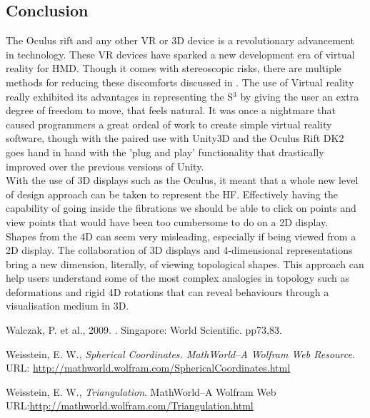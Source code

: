 \documentclass[12pt]{article} %
\begin{document}
\begin{flushleft}
\subsection{Conclusion} %
The Oculus rift and any other VR or 3D device is a revolutionary advancement in technology. These VR devices have sparked a new development era of virtual reality for HMD. Though it comes with stereoscopic risks, there are multiple methods for reducing these discomforts discussed in \cite{discomfort}. The use of Virtual reality really exhibited its advantages in representing the S$^{3}$ by giving the user an extra degree of freedom to move, that feels natural. It was once a nightmare that caused programmers a great ordeal of work to create simple virtual reality software, though with the paired use with Unity3D and the Oculus Rift DK2 goes hand in hand with the 'plug and play' functionality that drastically improved over the previous versions of Unity.\\
With the use of 3D displays such as the Oculus, it meant that a whole new level of design approach can be taken to represent the HF. Effectively having the capability of going inside the fibrations we should be able to click on points and view points that would have been too cumbersome to do on a 2D display. \\
Shapes from the 4D can seem very misleading, especially if being viewed from a 2D display. The collaboration of 3D displays and 4-dimensional representations bring a new dimension, literally, of viewing topological shapes. This approach can help users understand some of the most complex analogies in topology such as deformations and rigid 4D rotations that can reveal behaviours through a visualisation medium in 3D. 

\newpage
\begin{thebibliography}{99} %
Walczak, P. et al., 2009.
. Singapore: World Scientific. pp73,83.

Weisstein, E. W., {\em Spherical Coordinates. MathWorld--A Wolfram Web Resource}. URL: \url{http://mathworld.wolfram.com/SphericalCoordinates.html}

Weisstein, E. W., {\em Triangulation}. MathWorld--A Wolfram Web URL:\url{http://mathworld.wolfram.com/Triangulation.html}


\end{thebibliography}
\end{flushleft}
\end{document}
